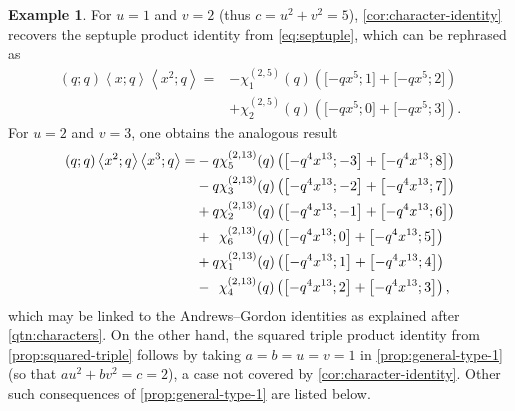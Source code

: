 \documentclass[reqno,11pt]{amsart}
\theoremstyle{definition}
\newtheorem{example}[theorem]{Example}
\theoremstyle{remark}
\numberwithin{equation}{section}
\newcommand{\la}{\left\langle}
\newcommand{\ra}{\right\rangle}
\newcommand{\vect}[2]{\big[{#1};{#2}\big]}
\begin{document}
\begin{example}
For $u = 1$ and $v = 2$ (thus $c = u^2 + v^2 = 5$), \cref{cor:character-identity} recovers the septuple product identity from \cref{eq:septuple}, which can be rephrased as
\[
\begin{aligned}
    (q; q)\la x; q\ra \la x^2; q\ra 
    =
    &-\chi_1^{(2,5)}(q) \left(\vect{-qx^5}{1} + \vect{-qx^5}{2}\right)
    \\
    &+\chi_2^{(2,5)}(q) \left(\vect{-qx^5}{0} + \vect{-qx^5}{3}\right).
\end{aligned}
\]
For $u = 2$ and $v = 3$, one obtains the analogous result
\[
\begin{aligned}
    (q; q)\la x^2; q\ra \la x^3; q \ra
    = &- q\chi_5^{(2,13)}(q) \left(\vect{-q^4 x^{13}}{-3} + \vect{-q^4 x^{13}}{8}\right) \\
    &- q\chi_3^{(2,13)}(q) \left(\vect{-q^4 x^{13}}{-2} + \vect{-q^4 x^{13}}{7}\right) \\
    &+ q\chi_2^{(2,13)}(q) \left(\vect{-q^4 x^{13}}{-1} + \vect{-q^4 x^{13}}{6}\right) \\
    &+ \hspace{0.16cm} \chi_6^{(2,13)}(q) \left(\vect{-q^4 x^{13}}{0} + \vect{-q^4 x^{13}}{5}\right) \\
    &+ q\chi_1^{(2,13)}(q) \left(\vect{-q^4 x^{13}}{1} + \vect{-q^4 x^{13}}{4}\right) \\
    &- \hspace{0.16cm} \chi_4^{(2,13)}(q) \left(\vect{-q^4 x^{13}}{2} + \vect{-q^4 x^{13}}{3}\right)
    ,
\end{aligned}
\]
which may be linked to the Andrews--Gordon identities \cite[Theorem 7.8]{andrews1998theory} as explained after \cref{qtn:characters}. On the other hand, the squared triple product identity from \cref{prop:squared-triple} follows by taking $a = b = u = v = 1$ in \cref{prop:general-type-1} (so that $au^2 + bv^2 = c = 2$), a case not covered by \cref{cor:character-identity}. Other such consequences of \cref{prop:general-type-1} are listed below.
\end{example}
\end{document}
